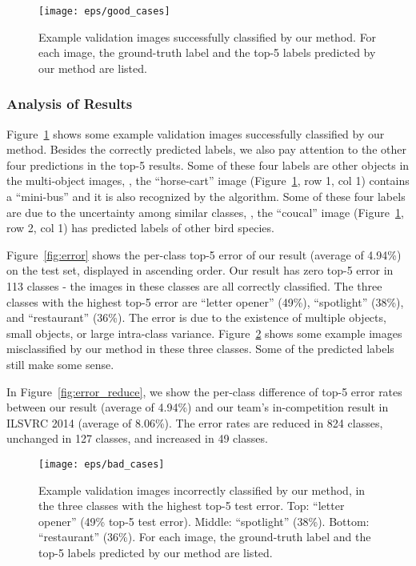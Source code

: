 \documentclass[10pt,twocolumn,letterpaper]{article}
\begin{document}
\begin{figure}[t]
\begin{center}
\texttt{[image: eps/good\_cases]}
\end{center}
\caption{Example validation images successfully classified by our method. For each image, the ground-truth label and the top-5 labels predicted by our method are listed.}
\label{fig:good_cases}
\end{figure}

\subsubsection*{Analysis of Results}

Figure~\ref{fig:good_cases} shows some example validation images successfully classified by our method. Besides the correctly predicted labels, we also pay attention to the other four predictions in the top-5 results. Some of these four labels are other objects in the multi-object images, \eg, the ``horse-cart'' image (Figure~\ref{fig:good_cases}, row 1, col 1) contains a ``mini-bus'' and it is also recognized by the algorithm. Some of these four labels are due to the uncertainty among similar classes, \eg, the ``coucal'' image (Figure~\ref{fig:good_cases}, row 2, col 1) has predicted labels of other bird species.

Figure~\ref{fig:error} shows the per-class top-5 error of our result (average of 4.94\%) on the test set, displayed in ascending order. Our result has zero top-5 error in 113 classes - the images in these classes are all correctly classified. The three classes with the highest top-5 error are ``letter opener'' (49\%), ``spotlight'' (38\%), and ``restaurant'' (36\%). The error is due to the existence of multiple objects, small objects, or large intra-class variance. Figure~\ref{fig:bad_cases} shows some example images misclassified by our method in these three classes. Some of the predicted labels still make some sense.

In Figure~\ref{fig:error_reduce}, we show the per-class difference of top-5 error rates between our result (average of 4.94\%) and our team's in-competition result in ILSVRC 2014 (average of 8.06\%). The error rates are reduced in 824 classes, unchanged in 127 classes, and increased in 49 classes.

\begin{figure}[t]
\begin{center}
\texttt{[image: eps/bad\_cases]}
\end{center}
\caption{Example validation images incorrectly classified by our method, in the three classes with the highest top-5 test error. Top: ``letter opener'' (49\% top-5 test error). Middle: ``spotlight'' (38\%). Bottom: ``restaurant'' (36\%). For each image, the ground-truth label and the top-5 labels predicted by our method are listed.}
\label{fig:bad_cases}
\end{figure}
\end{document}
